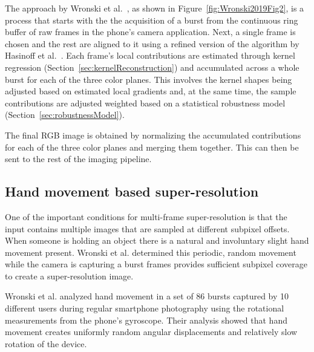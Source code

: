 \documentclass{sig-alternate}
\begin{document}
The approach by Wronski et al.~\cite{Wronski2019}, as shown in Figure~\ref{fig:Wronski2019Fig2}, is a process that starts with the the acquisition of a burst from the continuous ring buffer of raw frames in the phone's camera application. Next, a single frame is chosen and the rest are aligned to it using a refined version of the algorithm by Hasinoff et al.~\cite{Hasinoff2016}.
Each frame's local contributions are estimated through kernel regression (Section~\ref{sec:kernelReconstruction}) and accumulated across a whole burst for each of the three color planes. This involves the kernel shapes being adjusted based on estimated local gradients and, at the same time, the sample contributions are adjusted weighted based on a statistical robustness model (Section~\ref{sec:robustnessModel}).


The final RGB image is obtained by normalizing the accumulated contributions for each of the three color planes and merging them together. This can then be sent to the rest of the imaging pipeline.

\subsection{Hand movement based super-resolution}

One of the important conditions for multi-frame super-resolution is that the input contains multiple images that are sampled at different subpixel offsets. When someone is holding an object there is a natural and involuntary slight hand movement present. Wronski et al. determined this periodic, random movement while the camera is capturing a burst frames provides sufficient subpixel coverage to create a super-resolution image.

Wronski et al. analyzed hand movement in a set of 86 bursts captured by 10 different users during regular smartphone photography using the rotational measurements from the phone's gyroscope.
Their analysis showed that hand movement creates uniformly random angular displacements and relatively slow rotation of the device.


\end{document}
